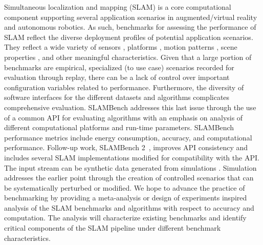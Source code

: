 
Simultaneous localization and mapping (SLAM) is a core computational
component supporting several application scenarios in augmented/virtual
reality and autonomous robotics. As such, benchmarks for assessing the
performance of SLAM reflect the diverse deployment profiles of potential
application scenarios.  
They reflect a wide variety of 
sensors \cite{smith2009new,KITTI,RGBDbenchmark}, 
platforms \cite{zhao2019closednav,delmerico2018benchmark},
motion patterns \cite{urban2017lafida,schubert2018vidataset,burri2016euroc}, 
scene properties \cite{ICLNUIM,maddern20171}, 
and other meaningful characteristics. 
Given that a large portion of benchmarks are empirical, specialized (to
use case) scenarios recorded for evaluation through replay, there can be
a lack of control over important configuration variables related to
performance.
Furthermore, the diversity of software interfaces for the different datasets
and algorithms complicates comprehensive evaluation.
SLAMBench \cite{nardi2015introducing} addresses this last issue through the use of a
common API for evaluating algorithms with an emphasis on analysis of
different computational platforms and run-time parameters.
SLAMBench performance metrics include energy consumption, accuracy, and
computational performance. 
Follow-up work, SLAMBench 2~\cite{bodin2018slambench2}, improves API consistency 
and includes several SLAM implementations modified for compatibility with the
API.  The input stream can be synthetic data generated from simulations
\cite{ICLNUIM,li2018interiornet}. Simulation addresses the earlier point through the creation
of controlled scenarios that can be systematically perturbed or modified.
We hope to advance the practice of benchmarking by providing a meta-analysis
or design of experiments inspired analysis of the SLAM benchmarks and
algorithms with respect to accuracy and computation.  The analysis will
characterize existing benchmarks and identify critical components of the SLAM
pipeline under different benchmark characteristics. 

